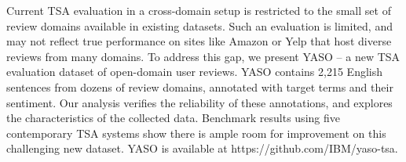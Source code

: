 Current TSA evaluation in a cross-domain setup is restricted to the small set of review domains available in existing datasets. Such an evaluation is limited, and may not reflect true performance on sites like Amazon or Yelp that host diverse reviews from many domains. To address this gap, we present YASO -- a new TSA evaluation dataset of open-domain user reviews. YASO contains 2,215 English sentences from dozens of review domains, annotated with target terms and their sentiment. Our analysis verifies the reliability of these annotations, and explores the characteristics of the collected data. Benchmark results using five contemporary TSA systems show there is ample room for improvement on this challenging new dataset. YASO is available at https://github.com/IBM/yaso-tsa.
